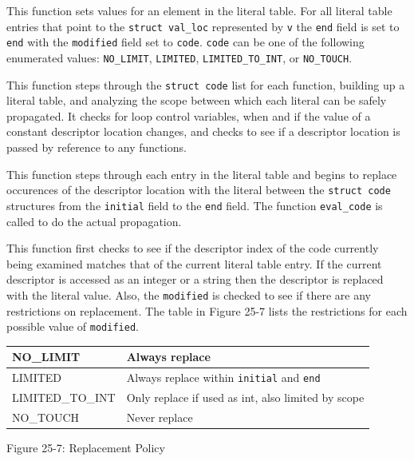 

This function sets values for an element in the literal table. For all
literal table entries that point to the \texttt{struct val\_loc}
represented by \texttt{v} the \texttt{end} field is set to
\texttt{end} with the \texttt{modified} field set to
\texttt{code}. \texttt{code} can be one of the following enumerated
values: \texttt{NO\_LIMIT}, \texttt{LIMITED},
\texttt{LIMITED\_TO\_INT}, or \texttt{NO\_TOUCH}.



This function steps through the \texttt{struct code} list for each
function, building up a literal table, and analyzing the scope between
which each literal can be safely propagated. It checks for loop
control variables, when and if the value of a constant descriptor
location changes, and checks to see if a descriptor location is passed
by reference to any functions.


This function steps through each entry in the literal table and begins
to replace occurences of the descriptor location with the literal
between the \texttt{struct code} structures from the \texttt{initial}
field to the \texttt{end} field.  The function \texttt{eval\_code} is
called to do the actual propagation.


This function first checks to see if the descriptor index of the code
currently being examined matches that of the current literal table
entry. If the current descriptor is accessed as an integer or a string
then the descriptor is replaced with the literal value. Also, the
\texttt{modified} is checked to see if there are any restrictions on
replacement. The table in Figure 25-7 lists the restrictions for
each possible value of \texttt{modified}.

\begin{center}
\tabletail{}
\tablelasttail{}
\begin{xtabular}{|m{1.4670599in}|m{3.2670598in}|}
\hline
{\ttfamily NO\_LIMIT} &
 Always replace\\\hline
{\ttfamily LIMITED} &
 Always replace within \texttt{initial} and \texttt{end}\\\hline
{\ttfamily LIMITED\_TO\_INT} &
 Only replace if used as int, also limited by scope\\\hline
{\ttfamily NO\_TOUCH} &
 Never replace\\\hline
\end{xtabular}
\end{center}
{\centering{}
Figure 25-7: Replacement Policy
\par}


